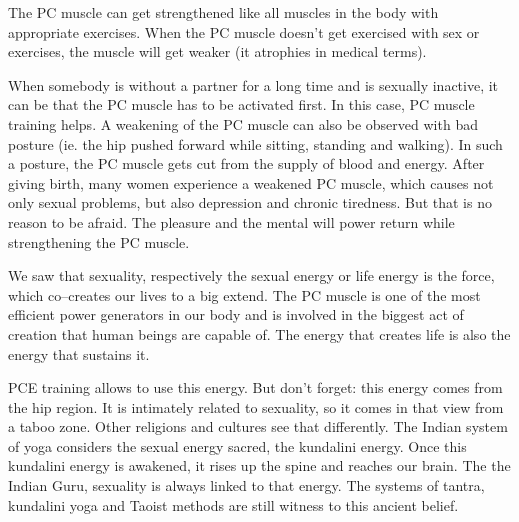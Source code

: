 \documentclass[../Book.Stress_regulation.tex]{subfiles}
\begin{document}
The PC muscle can get strengthened like all muscles in the body with appropriate exercises.
When the PC muscle doesn't get exercised with sex or exercises, the muscle will get weaker (it atrophies in medical terms).

When somebody is without a partner for a long time and is sexually inactive, it can be that the PC muscle has to be activated first.
In this case, PC muscle training helps.
A weakening of the PC muscle can also be observed with bad posture (ie. the hip pushed forward while sitting, standing and walking).
In such a posture, the PC muscle gets cut from the supply of blood and energy.
After giving birth, many women experience a weakened PC muscle, which causes not only sexual problems, but also depression and chronic tiredness.
But that is no reason to be afraid.
The pleasure and the mental will power return while strengthening the PC muscle.

We saw that sexuality, respectively the sexual energy or life energy is the force, which co--creates our lives to a big extend.
The PC muscle is one of the most efficient power generators in our body and is involved in the biggest act of creation that human beings are capable of.
The energy that creates life is also the energy that sustains it.

PCE training allows to use this energy. But don't forget: this energy comes from the hip region. It is intimately related to sexuality, so it comes in that view from a taboo zone.
Other religions and cultures see that differently. 
The Indian system of yoga considers the sexual energy sacred, the kundalini energy.
Once this kundalini energy is awakened, it rises up the spine and reaches our brain. 
The the Indian Guru, sexuality is always linked to that energy.
The systems of tantra, kundalini yoga and Taoist methods are still witness to this ancient belief.
\end{document}
